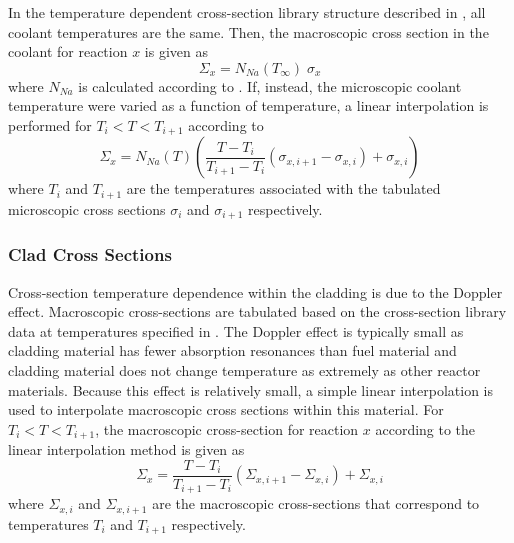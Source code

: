       In the temperature dependent cross-section library structure described in
      , all coolant temperatures are the same. Then, the
      macroscopic cross section in the coolant for reaction $x$ is given as
      \begin{equation}
        \Sigma_x = N_{Na}(T_{\infty}) \; \sigma_x
      \end{equation}
      where $N_{Na}$ is calculated according to .
      If, instead, the microscopic coolant temperature were varied as a function
      of temperature, a linear interpolation is performed for $T_{i}<T<T_{i+1}$
      according to
      \begin{equation}
        \Sigma_{x} = N_{Na}(T) 
          \left( \frac{T - T_{i}}{T_{i+1}-T_{i}} 
          (\sigma_{x,i+1} - \sigma_{x,i})  + \sigma_{x,i}\right)
      \end{equation}
      where $T_i$ and $T_{i+1}$ are the temperatures associated with the
      tabulated microscopic cross sections $\sigma_i$ and $\sigma_{i+1}$
      respectively. 

    \subsubsection{Clad Cross Sections}
      Cross-section temperature dependence within the cladding is due to the
      Doppler effect. Macroscopic cross-sections are tabulated based on the
      cross-section library data at temperatures specified in
      . The Doppler effect is typically small as cladding
      material has fewer absorption resonances than fuel material and cladding
      material does not change temperature as extremely as other reactor
      materials. Because this effect is relatively small, a simple linear
      interpolation is used to interpolate macroscopic cross sections within
      this material. For $T_i < T < T_{i+1}$, the macroscopic cross-section for
      reaction $x$ according to the linear interpolation method is given as
      \begin{equation}
        \label{eq:xs_linear_interpolation}
        \Sigma_{x} = 
          \frac{T - T_{i}}{T_{i+1}-T_{i}} 
          (\Sigma_{x,i+1} - \Sigma_{x,i})  + \Sigma_{x,i}
      \end{equation}
      where $\Sigma_{x,i}$ and $\Sigma_{x,i+1}$ are the macroscopic
      cross-sections that correspond to temperatures $T_i$ and $T_{i+1}$
      respectively. 

